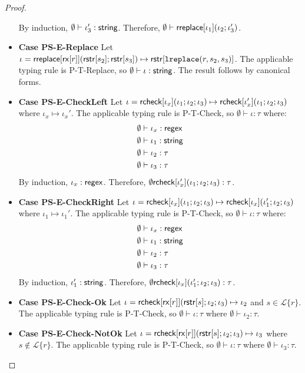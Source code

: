\documentclass[11pt,leqno]{article}
\theoremstyle{definition}
\newcommand{\Lagr}{\mathcal{L}}
\newcommand{\lang}[1]{\Lagr\{#1\}}
\newcommand{\rcheck}[4]{ {\sf rcheck}[#1](#2;#3;#4) }
\newcommand{\rx}[1]{ {\sf rx}[#1] }
\newcommand{\str}{{\sf string}}
\newcommand{\regex}{{\sf regex}}
\newcommand{\lreplace}[3]{{\sf lreplace}(#1; #2; #3)}
\renewcommand{\lreplace}[3]{{\tt lreplace}(#1, #2, #3)}
\begin{document}
\begin{proof}
\begin{itemize}[label=$ $,itemsep=1ex]
By induction, $\emptyset \vdash \iota_3' : \str$.
Therefore, $\emptyset \vdash {\sf rreplace}[\iota_1](\iota_2;\iota_3')$.

\item \textbf{Case PS-E-Replace}
Let $\iota = \rreplace{\rx{r}}{\rstr{s_2}}{\rstr{s_3}} \mapsto \rstr{\lreplace{r}{s_2}{s_3}}$.
The applicable typing rule is P-T-Replace, so $\emptyset \vdash \iota : \str$.
The result follows by canonical forms.

\item \textbf{Case PS-E-CheckLeft}
Let $\iota = \rcheck{\iota_x}{\iota_1}{\iota_2}{\iota_3} \mapsto \rcheck{\iota_x'}{\iota_1}{\iota_2}{\iota_3}$
where $\iota_x \mapsto \iota_x'$.
The applicable typing rule is P-T-Check, so $\emptyset \vdash \iota : \tau$ where:
\begin{align*}
  \emptyset &\vdash \iota_x : \regex \\
  \emptyset &\vdash \iota_1 : \str \\
  \emptyset &\vdash \iota_2 : \tau \\
  \emptyset &\vdash \iota_3 : \tau
\end{align*}
By induction, $\iota_x : \regex$. Therefore,
$\emptyset \rcheck{\iota_x'}{\iota_1}{\iota_2}{\iota_3} : \tau$.


\item \textbf{Case PS-E-CheckRight}
Let $\iota = \rcheck{\iota_x}{\iota_1}{\iota_2}{\iota_3} \mapsto \rcheck{\iota_x}{\iota_1'}{\iota_2}{\iota_3}$
where $\iota_1 \mapsto \iota_1'$.
The applicable typing rule is P-T-Check, so $\emptyset \vdash \iota : \tau$ where:
\begin{align*}
  \emptyset &\vdash \iota_x : \regex \\
  \emptyset &\vdash \iota_1 : \str \\
  \emptyset &\vdash \iota_2 : \tau \\
  \emptyset &\vdash \iota_3 : \tau
\end{align*}
By induction, $\iota_1' : \str$. Therefore,
$\emptyset \rcheck{\iota_x}{\iota_1'}{\iota_2}{\iota_3} : \tau$.

\item \textbf{Case PS-E-Check-Ok} 
Let $\iota = \rcheck{\rx{r}}{\rstr{s}}{\iota_2}{\iota_3} \mapsto \iota_2$ and $s \in \lang{r}$.
The applicable typing rule is P-T-Check, so $\emptyset \vdash \iota : \tau$ where
$\emptyset \vdash \iota_2 : \tau$.

\item \textbf{Case PS-E-Check-NotOk} 
Let $\iota = \rcheck{\rx{r}}{\rstr{s}}{\iota_2}{\iota_3} \mapsto \iota_3$ where $s \not \in \lang{r}$.
The applicable typing rule is P-T-Check, so $\emptyset \vdash \iota : \tau$ where
$\emptyset \vdash \iota_3 : \tau$.

\end{itemize}



\end{proof}
\end{document}
